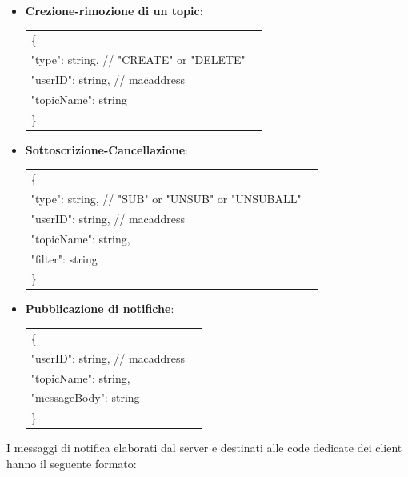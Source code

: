 \documentclass{article}
\begin{document}
\begin{itemize}

\item{\textbf{Crezione-rimozione di un topic}:}

\begin{tabular}{ll}
\{\\
	   \hspace{10mm} "type": string, // "CREATE" or "DELETE"\\
              \hspace{10mm} "userID": string, // macaddress\\
              \hspace{10mm} "topicName": string
\\
\}
\end{tabular}

\item{\textbf{Sottoscrizione-Cancellazione}:}

\begin{tabular}{ll}
\{\\	   
            \hspace{10mm} "type": string, // "SUB" or "UNSUB" or "UNSUBALL"\\
            \hspace{10mm} "userID": string, // macaddress\\
            \hspace{10mm} "topicName": string,\\
            \hspace{10mm} "filter": string 
\\
\}
\end{tabular}

\item{\textbf{Pubblicazione di notifiche}:}

\begin{tabular}{ll}
\{\\	   
           \hspace{10mm} "userID": string, // macaddress\\
           \hspace{10mm} "topicName": string,\\
           \hspace{10mm} "messageBody": string
\\
\}
\end{tabular}

\end{itemize}

I messaggi di notifica elaborati dal server e destinati alle code dedicate dei client hanno il seguente formato:
\end{document}
